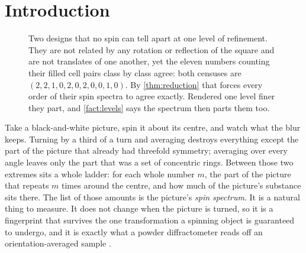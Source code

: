 \documentclass[11pt]{amsart}
\theoremstyle{definition}
\theoremstyle{remark}
\begin{document}
\newpage

\paperabstract

\section{Introduction}
\label{sec:intro}

\begin{figure}[!ht]
\centering
{}
\caption{Two designs that no spin can tell apart at one level of refinement. They are not related by any rotation or reflection of the square and are not translates of one another, yet the eleven numbers counting their filled cell pairs class by class agree: both censuses are $(2,2,1,0,2,0,2,0,0,1,0)$. By \cref{thm:reduction} that forces every order of their spin spectra to agree exactly. Rendered one level finer they part, and \cref{fact:levels} says the spectrum then parts them too.}
\label{fig:pair}
\end{figure}

Take a black-and-white picture, spin it about its centre, and watch what the blur keeps. Turning by a third of a turn and averaging destroys everything except the part of the picture that already had threefold symmetry; averaging over every angle leaves only the part that was a set of concentric rings. Between those two extremes sits a whole ladder: for each whole number $m$, the part of the picture that repeats $m$ times around the centre, and how much of the picture's substance sits there. The list of those amounts is the picture's \emph{spin spectrum}. It is a natural thing to measure. It does not change when the picture is turned, so it is a fingerprint that survives the one transformation a spinning object is guaranteed to undergo, and it is exactly what a powder diffractometer reads off an orientation-averaged sample \cite{cherny}.
\end{document}
